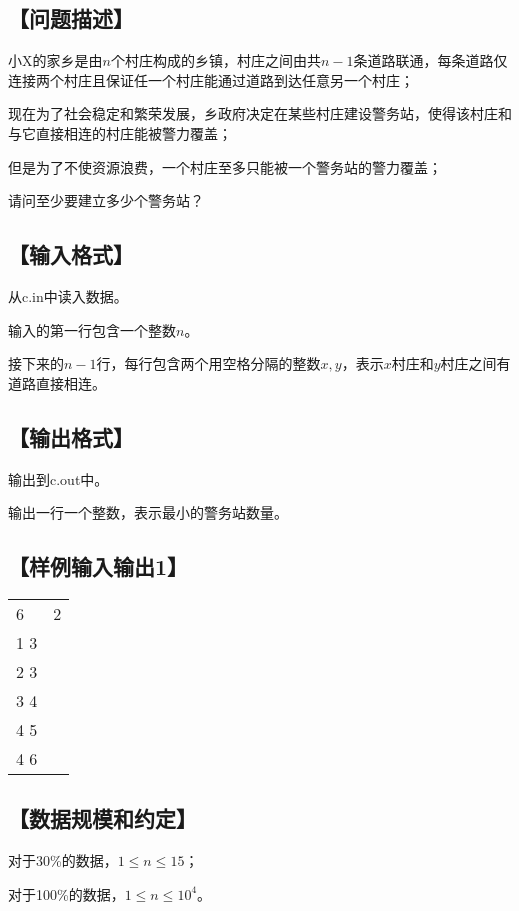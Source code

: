 \documentclass{article}
\begin{document}
		\subsection*{【问题描述】}
		
			小X的家乡是由\(n\)个村庄构成的乡镇，村庄之间由共\(n-1\)条道路联通，每条道路仅连接两个村庄且保证任一个村庄能通过道路到达任意另一个村庄；

			现在为了社会稳定和繁荣发展，乡政府决定在某些村庄建设警务站，使得该村庄和与它直接相连的村庄能被警力覆盖；

			但是为了不使资源浪费，一个村庄至多只能被一个警务站的警力覆盖；

			请问至少要建立多少个警务站？

		\subsection*{【输入格式】}

			从c.in中读入数据。

			输入的第一行包含一个整数\(n\)。
			
			接下来的\(n-1\)行，每行包含两个用空格分隔的整数\(x,y\)，表示\(x\)村庄和\(y\)村庄之间有道路直接相连。

		\subsection*{【输出格式】}

			输出到c.out中。

			输出一行一个整数，表示最小的警务站数量。
		
		\subsection*{【样例输入输出1】}

		\begin{table}[htbp]
		\centering
		\begin{tabular}{p{240pt}<{\raggedright}|p{240pt}<{\raggedright}}
			\hline
			6 & 2 \\
			1 3 \\ 2 3 \\ 3 4 \\ 4 5 \\ 4 6 \\
			\hline
		\end{tabular}
		\end{table}

		\subsection*{【数据规模和约定】}

		对于30\%的数据，\(1\leq n\leq 15\)；

		对于100\%的数据，\(1\leq n\leq 10^4\)。
\end{document}
